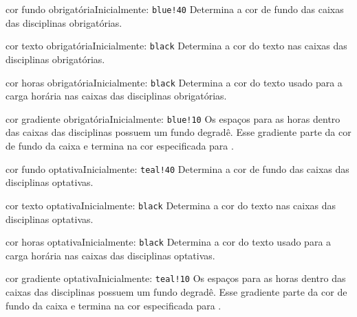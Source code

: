 \documentclass[a4paper, 11pt]{article}
\begin{document}
\begin{Optiondef}{cor fundo obrigatória}{}{Inicialmente: \texttt{blue!40}}
    Determina a cor de fundo das caixas das disciplinas obrigatórias.
\end{Optiondef}

\begin{Optiondef}{cor texto obrigatória}{}{Inicialmente: \texttt{black}}
    Determina a cor do texto nas caixas das disciplinas obrigatórias.
\end{Optiondef}

\begin{Optiondef}{cor horas obrigatória}{}{Inicialmente: \texttt{black}}
    Determina a cor do texto usado para a carga horária nas caixas das disciplinas obrigatórias.
\end{Optiondef}

\begin{Optiondef}{cor gradiente obrigatória}{}{Inicialmente: \texttt{blue!10}}
    Os espaços para as horas dentro das caixas das disciplinas possuem um fundo degradê. Esse gradiente parte da cor de fundo da caixa e termina na cor especificada para .
\end{Optiondef}

\begin{Optiondef}{cor fundo optativa}{}{Inicialmente: \texttt{teal!40}}
    Determina a cor de fundo das caixas das disciplinas optativas.
\end{Optiondef}

\begin{Optiondef}{cor texto optativa}{}{Inicialmente: \texttt{black}}
    Determina a cor do texto nas caixas das disciplinas optativas.
\end{Optiondef}

\begin{Optiondef}{cor horas optativa}{}{Inicialmente: \texttt{black}}
    Determina a cor do texto usado para a carga horária nas caixas das disciplinas optativas.
\end{Optiondef}

\begin{Optiondef}{cor gradiente optativa}{}{Inicialmente: \texttt{teal!10}}
    Os espaços para as horas dentro das caixas das disciplinas possuem um fundo degradê. Esse gradiente parte da cor de fundo da caixa e termina na cor especificada para .
\end{Optiondef}
\end{document}
